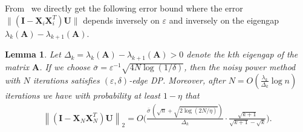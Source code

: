 \documentclass[11pt]{article}
\theoremstyle{plain}
\newtheorem{lemma}{Lemma}[section]
\theoremstyle{definition}
\theoremstyle{remark}
\begin{document}






From~\citep{hardt2014noisy} we directly get the following error bound where the error
$\| (\mathbf{I} - \mathbf{X}_i \mathbf{X}_i^T) \mathbf{U} \|$
depends inversely on $\varepsilon$ and inversely on the eigengap $\lambda_{k}(\mathbf{A}) - \lambda_{k+1}(\mathbf{A})$. %

\begin{lemma} \label{lem:ref_bound}
Let $\Delta_k=\lambda_{k}(\mathbf{A})-\lambda_{k+1}(\mathbf{A})>0$
denote the $k$th eigengap of the matrix $\mathbf{A}$. If we choose $\bar{\sigma} = \varepsilon^{-1} \sqrt{4 N \log(1/\delta)}$, then the noisy power method with $N$ iterations satisfies $(\varepsilon, \delta)$-edge DP.  Moreover, after $ N = O\left( \frac{\lambda_k}{\Delta_k} \log n  \right) $ iterations we have with probability at least $1-\eta$ that
\begin{equation*} 
\begin{aligned}
     \left\|  (\mathbf{I} - \mathbf{X}_N \mathbf{X}_N^T) \mathbf{U} \right\|_2 =  
     O\bigg( \frac{ \bar{\sigma} \, \left( \sqrt{n} + \sqrt{2 \log\left( {2N}/{\eta} \right)} \right)}{\Delta_k}  \cdot \frac{\sqrt{k+1}}{\sqrt{k+1} - \sqrt{k}} \bigg).
\end{aligned}
\end{equation*}
\end{lemma}
\end{document}
